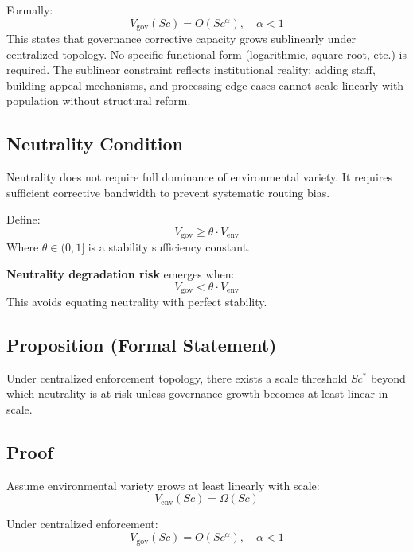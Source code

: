 \documentclass{article}
\begin{document}
Formally:
\begin{equation}
V_{\text{gov}}(Sc) = O(Sc^{\alpha}), \quad \alpha < 1
\end{equation}
This states that governance corrective capacity grows sublinearly under centralized topology. No specific functional form (logarithmic, square root, etc.) is required. The sublinear constraint reflects institutional reality: adding staff, building appeal mechanisms, and processing edge cases cannot scale linearly with population without structural reform.

\subsection{Neutrality Condition}

Neutrality does not require full dominance of environmental variety. It requires sufficient corrective bandwidth to prevent systematic routing bias.

Define:
\begin{equation}
V_{\text{gov}} \geq \theta \cdot V_{\text{env}}
\end{equation}
Where $\theta \in (0,1]$ is a stability sufficiency constant.

\textbf{Neutrality degradation risk} emerges when:
\begin{equation}
V_{\text{gov}} < \theta \cdot V_{\text{env}}
\end{equation}
This avoids equating neutrality with perfect stability.

\subsection{Proposition (Formal Statement)}

Under centralized enforcement topology, there exists a scale threshold $Sc^*$ beyond which neutrality is at risk unless governance growth becomes at least linear in scale.

\subsection{Proof}

Assume environmental variety grows at least linearly with scale:
\begin{equation}
V_{\text{env}}(Sc) = \Omega(Sc)
\end{equation}

Under centralized enforcement:
\begin{equation}
V_{\text{gov}}(Sc) = O(Sc^{\alpha}), \quad \alpha < 1
\end{equation}
\end{document}
